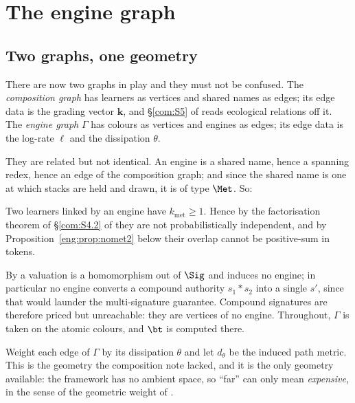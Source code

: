 \section{The engine graph}\label{eng:S6}
\label{eng:sec:code}

\subsection{Two graphs, one geometry}\label{eng:S6.1}

There are now two graphs in play and they must not be confused. The
\emph{composition graph} has learners as vertices and shared names as
edges; its edge data is the grading vector $\mathbf{k}$, and
\S\ref{com:S5} of \chComp reads ecological relations off it. The \emph{engine
graph} $\Gamma$ has colours as vertices and engines as edges; its edge data
is the log-rate $\ell$ and the dissipation $\theta$.

They are related but not identical. An engine is a shared name, hence a
spanning redex, hence an edge of the composition graph; and since the
shared name is one at which stacks are held and drawn, it is of type
$\Met$. So:

\begin{proposition}\label{eng:prop:convmet}
Two learners linked by an engine have $k_{\mathrm{met}} \geq 1$. Hence by
the factorisation theorem of \S\ref{com:S4.2} of \chComp they are not
probabilistically independent, and by
Proposition~\ref{eng:prop:nomet2} below their overlap cannot be positive-sum in
tokens.
\end{proposition}

\begin{remark}\label{eng:vertices-atomic-colours}
By \cite[Prop.~4.4]{vtok} a valuation is a homomorphism out of $\Sig$ and
induces no engine; in particular no engine converts a compound authority
$s_1 * s_2$ into a single $s'$, since that would launder the multi-signature
guarantee. Compound signatures are therefore priced but unreachable: they
are vertices of no engine. Throughout, $\Gamma$ is taken on the atomic
colours, and $\bt$ is computed there.
\end{remark}

\begin{definition}\label{eng:cost-metric}
Weight each edge of $\Gamma$ by its dissipation $\theta$ and let $d_\theta$
be the induced path metric. This is the geometry the composition note
lacked, and it is the only geometry available: the framework has no ambient
space, so ``far'' can only mean \emph{expensive}, in the sense of the
geometric weight of \cite{CE}.
\end{definition}

